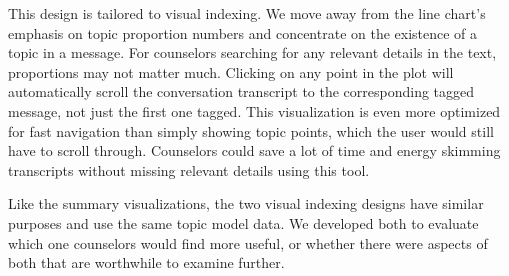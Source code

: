 This design is tailored to visual indexing. We move away from the line chart's
emphasis on topic proportion numbers and concentrate on the existence of a topic in
a message. For counselors searching for any relevant details in the text, proportions
may not matter much. Clicking on any point in the plot will automatically scroll the
conversation transcript to the corresponding tagged message, not just the first one
tagged. This visualization is even more optimized for fast navigation than simply
showing topic points, which the user would still have to scroll through. Counselors
could save a lot of time and energy skimming transcripts without missing relevant
details using this tool.

Like the summary visualizations, the two visual indexing designs have similar
purposes and use the same topic model data. We developed both to evaluate which
one counselors would find more useful, or whether there were aspects of both that are
worthwhile to examine further.
